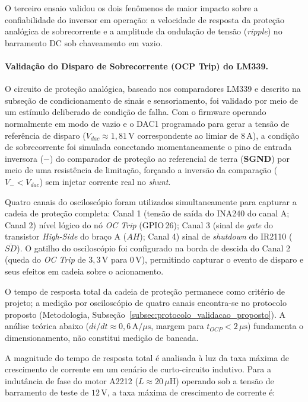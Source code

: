 O terceiro ensaio validou os dois fenômenos de maior impacto sobre a confiabilidade do inversor em operação: a velocidade de resposta da proteção analógica de sobrecorrente e a amplitude da ondulação de tensão (\textit{ripple}) no barramento DC sob chaveamento em vazio.

\paragraph{Validação do Disparo de Sobrecorrente (OCP Trip) do LM339.}

O circuito de proteção analógica, baseado nos comparadores LM339 e descrito na subseção de condicionamento de sinais e sensoriamento, foi validado por meio de um estímulo deliberado de condição de falha. Com o firmware operando normalmente em modo de vazio e o DAC1 programado para gerar a tensão de referência de disparo ($V_{dac} \approx 1{,}81\,\text{V}$ correspondente ao limiar de $8\,\text{A}$), a condição de sobrecorrente foi simulada conectando momentaneamente o pino de entrada inversora ($-$) do comparador de proteção ao referencial de terra (\textbf{SGND}) por meio de uma resistência de limitação, forçando a inversão da comparação ($V_{-} < V_{dac}$) sem injetar corrente real no \textit{shunt}.

Quatro canais do osciloscópio foram utilizados simultaneamente para capturar a cadeia de proteção completa: Canal 1 (tensão de saída do INA240 do canal A; Canal 2) nível lógico do nó \textit{OC Trip} (GPIO\,26); Canal 3 (sinal de \textit{gate} do transistor \textit{High-Side} do braço A ($AH$); Canal 4) sinal de \textit{shutdown} do IR2110 ($\overline{SD}$). O gatilho do osciloscópio foi configurado na borda de descida do Canal 2 (queda do \textit{OC Trip} de $3{,}3\,\text{V}$ para $0\,\text{V}$), permitindo capturar o evento de disparo e seus efeitos em cadeia sobre o acionamento.

O tempo de resposta total da cadeia de proteção permanece como critério de projeto; a medição por osciloscópio de quatro canais encontra-se no protocolo proposto (Metodologia, Subseção~\ref{subsec:protocolo_validacao_proposto}). A análise teórica abaixo ($di/dt \approx 0{,}6\,\text{A}/\mu\text{s}$, margem para $t_{OCP} < 2\,\mu\text{s}$) fundamenta o dimensionamento, não constitui medição de bancada.

A magnitude do tempo de resposta total é analisada à luz da taxa máxima de crescimento de corrente em um cenário de curto-circuito indutivo. Para a indutância de fase do motor A2212 ($L \approx 20\,\mu\text{H}$) operando sob a tensão de barramento de teste de $12\,\text{V}$, a taxa máxima de crescimento de corrente é:


